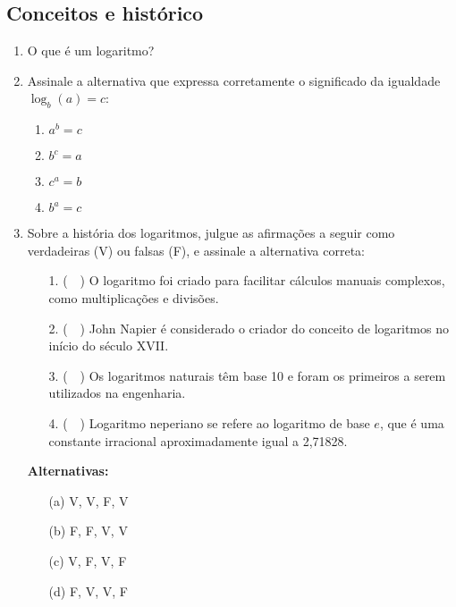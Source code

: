 \documentclass[12pt,a4paper]{article}
\begin{document}
\subsection*{Conceitos e histórico}
\begin{enumerate}
  \item O que é um logaritmo?

  \item Assinale a alternativa que expressa corretamente o significado da igualdade $\log_b(a) = c$:
        \begin{enumerate}
          \item $a^b = c$
          \item $b^c = a$
          \item $c^a = b$
          \item $b^a = c$
        \end{enumerate}

  \item Sobre a história dos logaritmos, julgue as afirmações a seguir como verdadeiras (V) ou falsas (F), e assinale a alternativa correta:

        \begin{enumerate}
          \item[1.] (~~) O logaritmo foi criado para facilitar cálculos manuais complexos, como multiplicações e divisões.
          \item[2.] (~~) John Napier é considerado o criador do conceito de logaritmos no início do século XVII.
          \item[3.] (~~) Os logaritmos naturais têm base 10 e foram os primeiros a serem utilizados na engenharia.
          \item[4.] (~~) Logaritmo neperiano se refere ao logaritmo de base \(e\), que é uma constante irracional aproximadamente igual a 2{,}71828.
        \end{enumerate}

        \textbf{Alternativas:}
        \begin{enumerate}
          \item[(a)] V, V, F, V
          \item[(b)] F, F, V, V
          \item[(c)] V, F, V, F
          \item[(d)] F, V, V, F
        \end{enumerate}

\end{enumerate}
\end{document}
